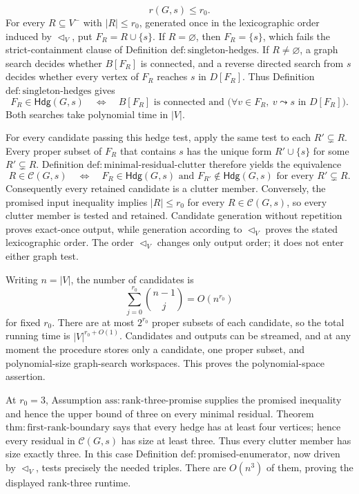 \[
 r(G,s)\leq r_0.
\]
For every \(R\subseteq V^{-}\) with \(|R|\leq r_0\), generated once in the lexicographic order induced by \(\triangleleft_V\), put \(F_R=R\cup\{s\}\).  If \(R=\varnothing\), then \(F_R=\{s\}\), which fails the strict-containment clause of Definition \(\mathrm{def{:}singleton\mbox{-}hedges}\).  If \(R\neq\varnothing\), a graph search decides whether \(B[F_R]\) is connected, and a reverse directed search from \(s\) decides whether every vertex of \(F_R\) reaches \(s\) in \(D[F_R]\).  Thus Definition \(\mathrm{def{:}singleton\mbox{-}hedges}\) gives
\[
 F_R\in\mathsf{Hdg}(G,s)
 \quad\Longleftrightarrow\quad
 B[F_R]\text{ is connected and }
 \bigl(\forall v\in F_R,\ v\leadsto s\text{ in }D[F_R]\bigr).
\]
Both searches take polynomial time in \(|V|\).

For every candidate passing this hedge test, apply the same test to each \(R'\subsetneq R\).  Every proper subset of \(F_R\) that contains \(s\) has the unique form \(R'\cup\{s\}\) for some \(R'\subsetneq R\).  Definition \(\mathrm{def{:}minimal\mbox{-}residual\mbox{-}clutter}\) therefore yields the equivalence
\[
 R\in\mathcal C(G,s)
 \quad\Longleftrightarrow\quad
 F_R\in\mathsf{Hdg}(G,s)
 \text{ and }
 F_{R'}\notin\mathsf{Hdg}(G,s)
 \text{ for every }R'\subsetneq R.
\]
Consequently every retained candidate is a clutter member.  Conversely, the promised input inequality implies \(|R|\leq r_0\) for every \(R\in\mathcal C(G,s)\), so every clutter member is tested and retained.  Candidate generation without repetition proves exact-once output, while generation according to \(\triangleleft_V\) proves the stated lexicographic order.  The order \(\triangleleft_V\) changes only output order; it does not enter either graph test.

Writing \(n=|V|\), the number of candidates is
\[
 \sum_{j=0}^{r_0}\binom{n-1}{j}=O(n^{r_0})
\]
for fixed \(r_0\).  There are at most \(2^{r_0}\) proper subsets of each candidate, so the total running time is \(|V|^{r_0+O(1)}\).  Candidates and outputs can be streamed, and at any moment the procedure stores only a candidate, one proper subset, and polynomial-size graph-search workspaces.  This proves the polynomial-space assertion.

At \(r_0=3\), Assumption \(\mathrm{ass{:}rank\mbox{-}three\mbox{-}promise}\) supplies the promised inequality and hence the upper bound of three on every minimal residual.  Theorem \(\mathrm{thm{:}first\mbox{-}rank\mbox{-}boundary}\) says that every hedge has at least four vertices; hence every residual in \(\mathcal C(G,s)\) has size at least three.  Thus every clutter member has size exactly three.  In this case Definition \(\mathrm{def{:}promised\mbox{-}enumerator}\), now driven by \(\triangleleft_V\), tests precisely the needed triples.  There are \(O(n^3)\) of them, proving the displayed rank-three runtime.

